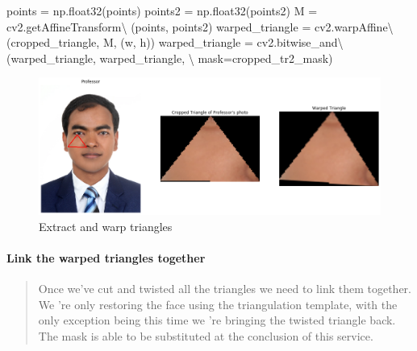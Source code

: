 \documentclass[12pt, a4paper, twocolumn]{article}
\newenvironment{Shaded}{}{}
\newcommand{\OperatorTok}[1]{\textcolor[rgb]{0.40,0.40,0.40}{#1}}
\newcommand{\NormalTok}[1]{#1}
\let\oldparagraph\paragraph
\renewcommand{\paragraph}[1]{\oldparagraph{#1}\mbox{}}
\begin{document}
\begin{Shaded}
\small
\begin{Highlighting}[]
\NormalTok{points }\OperatorTok{=}\NormalTok{ np.float32(points)}
\NormalTok{points2 }\OperatorTok{=}\NormalTok{ np.float32(points2)}
\NormalTok{M }\OperatorTok{=}\NormalTok{ cv2.getAffineTransform}\OperatorTok{\textbackslash{}}
\NormalTok{(points, points2)}
\NormalTok{warped_triangle }\OperatorTok{=}\NormalTok{ cv2.warpAffine}\OperatorTok{\textbackslash{}}
\NormalTok{(cropped_triangle, M, (w, h))}
\NormalTok{warped_triangle }\OperatorTok{=}\NormalTok{ cv2.bitwise_and}\OperatorTok{\textbackslash{}}
\NormalTok{(warped_triangle, warped_triangle, }\OperatorTok{\textbackslash{}}
\NormalTok{mask}\OperatorTok{=}\NormalTok{cropped_tr2_mask)}
\end{Highlighting}
\end{Shaded}

\begin{figure}
	\centering
	\includegraphics{meta/output_35_0.png}
	\caption{Extract and warp triangles}
\end{figure}

\paragraph{Link the warped triangles together}\label{header-n228}

\begin{quote}
	Once we've cut and twisted all the triangles we need to link them
	together.\\
	We 're only restoring the face using the triangulation template, with
	the only exception being this time we 're bringing the twisted triangle
	back.\\
	The mask is able to be substituted at the conclusion of this service.
\end{quote}
\end{document}
